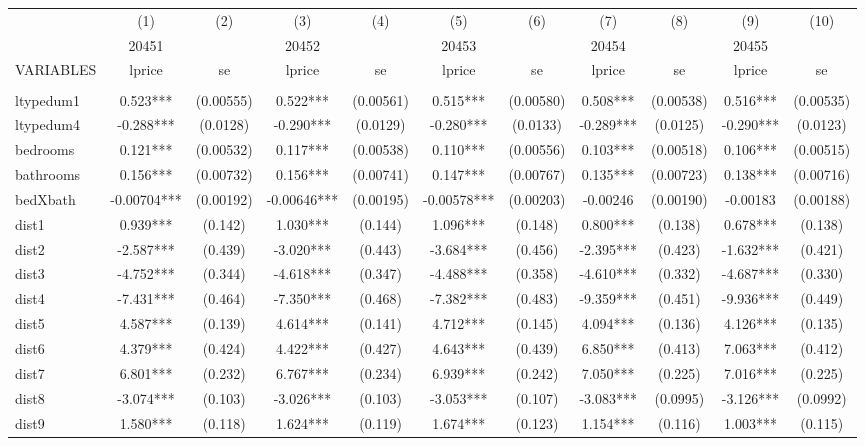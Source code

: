 \documentclass[]{article}
\begin{document}
\begin{tabular}{lcccccccccc} \hline
 & (1) & (2) & (3) & (4) & (5) & (6) & (7) & (8) & (9) & (10) \\
 & 20451 &  & 20452 &  & 20453 &  & 20454 &  & 20455 &  \\
VARIABLES & lprice & se & lprice & se & lprice & se & lprice & se & lprice & se \\ \hline
 &  &  &  &  &  &  &  &  &  &  \\
ltypedum1 & 0.523*** & (0.00555) & 0.522*** & (0.00561) & 0.515*** & (0.00580) & 0.508*** & (0.00538) & 0.516*** & (0.00535) \\
ltypedum4 & -0.288*** & (0.0128) & -0.290*** & (0.0129) & -0.280*** & (0.0133) & -0.289*** & (0.0125) & -0.290*** & (0.0123) \\
bedrooms & 0.121*** & (0.00532) & 0.117*** & (0.00538) & 0.110*** & (0.00556) & 0.103*** & (0.00518) & 0.106*** & (0.00515) \\
bathrooms & 0.156*** & (0.00732) & 0.156*** & (0.00741) & 0.147*** & (0.00767) & 0.135*** & (0.00723) & 0.138*** & (0.00716) \\
bedXbath & -0.00704*** & (0.00192) & -0.00646*** & (0.00195) & -0.00578*** & (0.00203) & -0.00246 & (0.00190) & -0.00183 & (0.00188) \\
dist1 & 0.939*** & (0.142) & 1.030*** & (0.144) & 1.096*** & (0.148) & 0.800*** & (0.138) & 0.678*** & (0.138) \\
dist2 & -2.587*** & (0.439) & -3.020*** & (0.443) & -3.684*** & (0.456) & -2.395*** & (0.423) & -1.632*** & (0.421) \\
dist3 & -4.752*** & (0.344) & -4.618*** & (0.347) & -4.488*** & (0.358) & -4.610*** & (0.332) & -4.687*** & (0.330) \\
dist4 & -7.431*** & (0.464) & -7.350*** & (0.468) & -7.382*** & (0.483) & -9.359*** & (0.451) & -9.936*** & (0.449) \\
dist5 & 4.587*** & (0.139) & 4.614*** & (0.141) & 4.712*** & (0.145) & 4.094*** & (0.136) & 4.126*** & (0.135) \\
dist6 & 4.379*** & (0.424) & 4.422*** & (0.427) & 4.643*** & (0.439) & 6.850*** & (0.413) & 7.063*** & (0.412) \\
dist7 & 6.801*** & (0.232) & 6.767*** & (0.234) & 6.939*** & (0.242) & 7.050*** & (0.225) & 7.016*** & (0.225) \\
dist8 & -3.074*** & (0.103) & -3.026*** & (0.103) & -3.053*** & (0.107) & -3.083*** & (0.0995) & -3.126*** & (0.0992) \\
dist9 & 1.580*** & (0.118) & 1.624*** & (0.119) & 1.674*** & (0.123) & 1.154*** & (0.116) & 1.003*** & (0.115) \\

\end{tabular}
\end{document}
